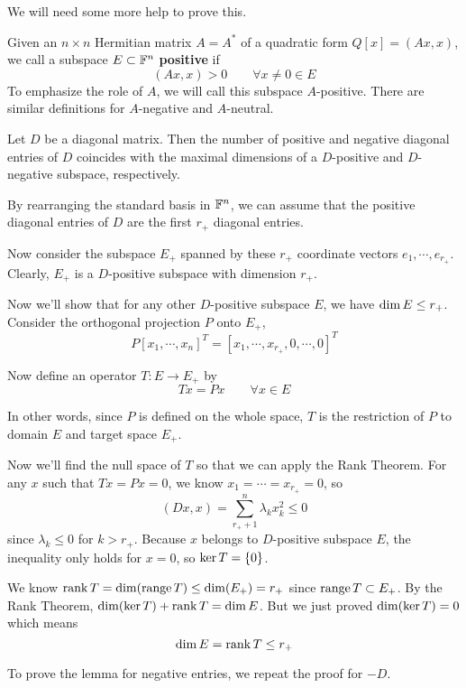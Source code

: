 We will need some more help to prove this. 

\begin{definition}
Given an $n \times n$ Hermitian matrix $A = A^{*}$ of a quadratic form $Q[x] = (Ax, x)$, we call a subspace $E \subset \mathbb{F}^{n}$ \textbf{positive} if 
$$(Ax, x) > 0 \qquad \forall x \neq 0 \in E$$ 
To emphasize the role of $A$, we will call this subspace $A$-positive. There are similar definitions for $A$-negative and $A$-neutral. 
\end{definition}

\begin{lemma}
Let $D$ be a diagonal matrix. Then the number of positive and negative diagonal entries of $D$ coincides with the maximal dimensions of a $D$-positive and $D$-negative subspace, respectively. 
\end{lemma}

\begin{lproof}
By rearranging the standard basis in $\mathbb{F}^{n}$, we can assume that the positive diagonal entries of $D$ are the first $r_{+}$ diagonal entries. 

Now consider the subspace $E_{+}$ spanned by these $r_{+}$ coordinate vectors $e_{1}, \cdots, e_{r_{+}}$. Clearly, $E_{+}$ is a $D$-positive subspace with dimension $r_{+}$. 

Now we'll show that for any other $D$-positive subspace $E$, we have $\operatorname{dim} E \leq r_{+}$. Consider the orthogonal projection $P$ onto $E_{+}$, 
$$P[x_{1}, \cdots, x_{n}]^{T} = [x_{1}, \cdots, x_{r_{+}}, 0, \cdots, 0]^{T}$$

Now define an operator $T: E \rightarrow E_{+}$ by 
$$Tx = Px \qquad \forall x \in E$$

In other words, since $P$ is defined on the whole space, $T$ is the restriction of $P$ to domain $E$ and target space $E_{+}$. 

Now we'll find the null space of $T$ so that we can apply the Rank Theorem. For any $x$ such that $Tx = Px = 0$, we know $x_{1} = \cdots = x_{r_{+}} = 0$, so 
$$(Dx, x) = \sum_{r_{+} + 1}^{n} \lambda_{k} x_{k}^{2} \leq 0$$
since $\lambda_{k} \leq 0$ for $k > r_{+}$. Because $x$ belongs to $D$-positive subspace $E$, the inequality only holds for $x = 0$, so $\operatorname{ker} T = \{0\}$. 

We know $\operatorname{rank} T = \operatorname{dim}(\operatorname{range} T) \leq \operatorname{dim}(E_{+}) = r_{+}$ since $\operatorname{range} T \subset E_{+}$. By the Rank Theorem, $\operatorname{dim}(\operatorname{ker} T) + \operatorname{rank} T = \operatorname{dim} E$. But we just proved $\operatorname{dim}(\operatorname{ker} T) = 0$ which means 
$$\operatorname{dim} E = \operatorname{rank} T \leq r_{+}$$

To prove the lemma for negative entries, we repeat the proof for $-D$. 
\end{lproof}

